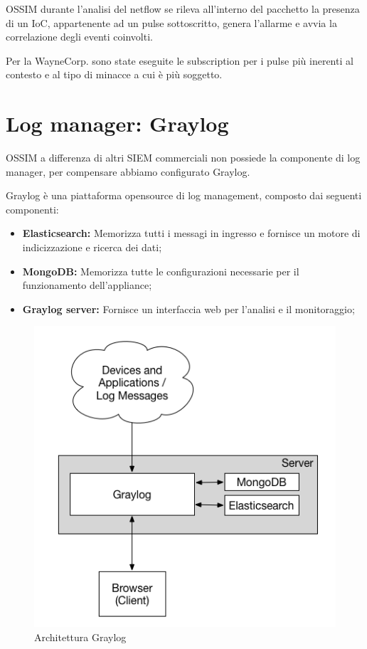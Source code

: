 OSSIM durante l’analisi del netflow se rileva all'interno del pacchetto la presenza di un IoC, appartenente ad un pulse sottoscritto, genera l’allarme e avvia la correlazione degli eventi coinvolti. \par
Per la WayneCorp. sono state eseguite le subscription per i pulse più inerenti al contesto e al tipo di minacce a cui è più soggetto.

\newpage


\section{Log manager: Graylog}


OSSIM a differenza di altri SIEM commerciali non possiede la componente di log manager, per compensare abbiamo configurato Graylog.\par
Graylog è una piattaforma opensource di log management, composto dai seguenti componenti:

\begin{itemize}
    \item\textbf{Elasticsearch:} Memorizza tutti i messagi in ingresso e fornisce un motore di indicizzazione e ricerca dei dati;
    \item\textbf{MongoDB:} Memorizza tutte le configurazioni necessarie per il funzionamento dell'appliance;
    \item\textbf{Graylog server:} Fornisce un interfaccia web per l’analisi e il monitoraggio;
\end{itemize}

  \begin{figure}[h]
            \begin{center}
                \includegraphics[width=0.60\columnwidth]{images/4_caso_d'uso_img/glArch.png}
            \end{center}
            \caption{Architettura Graylog}
            \label{fig:Architettura Graylog}
    \end{figure}
        
